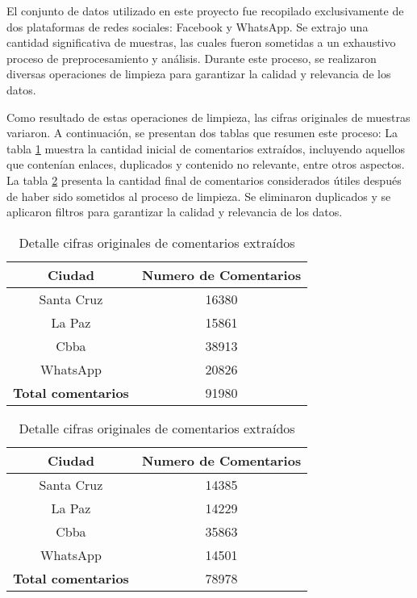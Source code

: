 El conjunto de datos utilizado en este proyecto fue recopilado exclusivamente de dos plataformas de redes sociales: Facebook y WhatsApp. Se extrajo una cantidad significativa de muestras, las cuales fueron sometidas a un exhaustivo proceso de preprocesamiento y análisis. Durante este proceso, se realizaron diversas operaciones de limpieza para garantizar la calidad y relevancia de los datos.

Como resultado de estas operaciones de limpieza, las cifras originales de muestras variaron. A continuación, se presentan dos tablas que resumen este proceso: La tabla \ref{tbl:14} muestra la cantidad inicial de comentarios extraídos, incluyendo aquellos que contenían enlaces, duplicados y contenido no relevante, entre otros aspectos. La tabla \ref{tbl:15} presenta la cantidad final de comentarios considerados útiles después de haber sido sometidos al proceso de limpieza. Se eliminaron duplicados y se aplicaron filtros para garantizar la calidad y relevancia de los datos.

\begin{table}[!ht]
	\centering
	\begin{tabular}{|c|c|}
		\hline
		\textbf{Ciudad} & \textbf{Numero de Comentarios} \\ \hline
		Santa Cruz & 16380 \\ 
		La Paz & 15861 \\ 
		Cbba & 38913 \\ 
		WhatsApp & 20826 \\ \hline
		\textbf{Total comentarios} & 91980 \\ \hline
	\end{tabular}
	\caption{Detalle cifras originales de comentarios extraídos}
	\label{tbl:14}
\end{table}

\begin{table}[!ht]
	\centering
	\begin{tabular}{|c|c|}
		\hline
		\textbf{Ciudad} & \textbf{Numero de Comentarios} \\ \hline
		Santa Cruz & 14385 \\ 
		La Paz & 14229 \\ 
		Cbba & 35863 \\ 
		WhatsApp & 14501 \\ \hline
		\textbf{Total comentarios} & 78978 \\ \hline
	\end{tabular}
	\caption{Detalle cifras originales de comentarios extraídos}
	\label{tbl:15}
\end{table}

